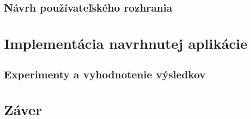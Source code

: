 \section{Návrh používateľského rozhrania}

\chapter{Implementácia navrhnutej aplikácie}

\section{Experimenty a vyhodnotenie výsledkov}

\chapter{Záver}



%
